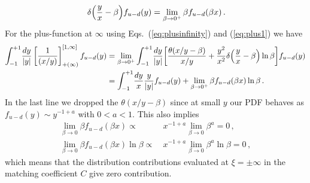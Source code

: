 \documentclass[prd,aps,twocolumn,preprintnumbers,showpacs,nofootinbib,superscriptaddress,notitlepage]{revtex4-1}
\newcommand{\nn}{\nonumber}
\DeclareRobustCommand{\eqs}[2]{Eqs.~(\ref{eq:#1}) and (\ref{eq:#2})}
\begin{document}
\begin{widetext}
\begin{align}
\, \delta\Big({y\over x} -\beta\Big) f_{u-d}(y)
=\lim_{\beta\to0^+}\beta f_{u-d}(\beta x)\,.
\end{align}
For the plus-function at $\infty$ using \eqs{plusinfinity}{plus1} we have
\begin{align}
\int_{-1}^{+1}\! {dy\over |y|} \left[{1\over (x/y)}\right]_{+(\infty)}^{[1,\infty]} f_{u-d}(y)
&= \lim_{\beta\to 0^+} \int_{-1}^{+1}\! {dy\over |y|}
\bigg[  {\theta(x/y-\beta) \over x/y}
+ {y^2\over x^2}\delta\Bigl({y\over x} -\beta\Bigr)\ln\beta  \bigg] f_{u-d}(y)
\nn\\
&= \int_{-1}^{+1}\! {dy\over x} {y\over |y|} f_{u-d}(y)
+ \lim_{\beta\to 0^+}\beta f_{u-d}(\beta x)\ln\beta
\,. \nn
\end{align}
In the last line we dropped the $\theta(x/y-\beta)$ since at small $y$ our PDF behaves as $f_{u-d}(y)\sim y^{-1+a}$ with $0<a<1$. This also implies
\begin{align}
\lim_{\beta\to0}\beta f_{u-d}(\beta x) \propto\: & x^{-1+a}\lim_{\beta\to0} \beta^a  =0\,, \nn\\
\lim_{\beta\to0}\beta f_{u-d}(\beta x)\ln\beta \propto\: & x^{-1+a}\lim_{\beta\to0} \beta^a \ln\beta =0\,,
\end{align}
which means that the distribution contributions evaluated at $\xi=\pm\infty$ in the matching coefficient $C$ give zero contribution.


\end{widetext}
\end{document}
